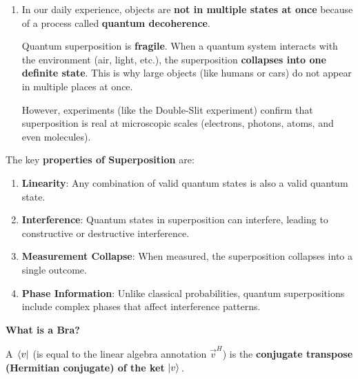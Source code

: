 \begin{enumerate}
  
  \item {} In our daily experience, objects are \textbf{not in multiple states at once} because of a process called \textbf{quantum decoherence}.

  Quantum superposition is \textbf{fragile}. When a quantum system interacts with the environment (air, light, etc.), the superposition \textbf{collapses into one definite state}. This is why large objects (like humans or cars) do not appear in multiple places at once.
  
  However, experiments (like the Double-Slit experiment) confirm that superposition is real at microscopic scales (electrons, photons, atoms, and even molecules).
\end{enumerate}

\newpage

\noindent
The key \textbf{properties of Superposition} are:
\begin{enumerate}
    \item \textbf{Linearity}: Any combination of valid quantum states is also a valid quantum state.
    \item \textbf{Interference}: Quantum states in superposition can interfere, leading to constructive or destructive interference.
    \item \textbf{Measurement Collapse}: When measured, the superposition collapses into a single outcome.
    \item \textbf{Phase Information}: Unlike classical probabilities, quantum superpositions include complex phases that affect interference patterns.
\end{enumerate}

\begin{flushleft}
    \textcolor{Green3}{ \textbf{What is a Bra?}}
\end{flushleft}
A  $\left.\langle v \right|$ (is equal to the linear algebra annotation $\overrightarrow{v}^{H}$) is the \textbf{conjugate transpose (Hermitian conjugate) of the ket} $\left| v \rangle\right.$.

